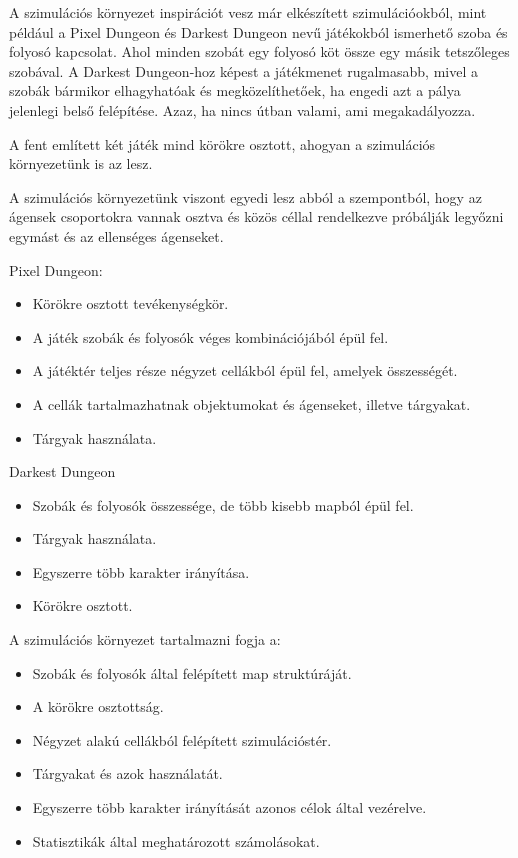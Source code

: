 

A szimulációs környezet inspirációt vesz már elkészített szimulációokból, mint például a Pixel Dungeon \cite{pixeldungeon} és Darkest Dungeon \cite{darkestdungeon} 
nevű játékokból ismerhető szoba és folyosó kapcsolat. Ahol minden szobát egy folyosó köt össze egy másik tetszőleges szobával.
A Darkest Dungeon-hoz képest a játékmenet rugalmasabb, mivel a szobák bármikor elhagyhatóak és megközelíthetőek, ha engedi azt a pálya jelenlegi belső felépítése.
Azaz, ha nincs útban valami, ami megakadályozza.

A fent említett két játék mind körökre osztott, ahogyan a szimulációs környezetünk is az lesz.

A szimulációs környezetünk viszont egyedi lesz abból a szempontból, hogy az ágensek csoportokra vannak osztva és közös céllal
rendelkezve próbálják legyőzni egymást és az ellenséges ágenseket.


\noindent Pixel Dungeon:

\begin{itemize}
    \item Körökre osztott tevékenységkör.
    \item A játék szobák és folyosók véges kombinációjából épül fel.
    \item A játéktér teljes része négyzet cellákból épül fel, amelyek összességét.
    \item A cellák tartalmazhatnak objektumokat és ágenseket, illetve tárgyakat.
    \item Tárgyak használata.
\end{itemize}

\noindent Darkest Dungeon

\begin{itemize}
    \item Szobák és folyosók összessége, de több kisebb mapból épül fel.
    \item Tárgyak használata.
    \item Egyszerre több karakter irányítása.
    \item Körökre osztott.
\end{itemize}

\noindent A szimulációs környezet tartalmazni fogja a:

\begin{itemize}
    \item Szobák és folyosók által felépített map struktúráját.
    \item A körökre osztottság.
    \item Négyzet alakú cellákból felépített szimulációstér.
    \item Tárgyakat és azok használatát.
    \item Egyszerre több karakter irányítását azonos célok által vezérelve.
    \item Statisztikák által meghatározott számolásokat.
\end{itemize}

